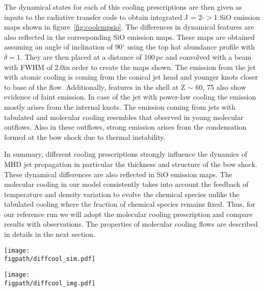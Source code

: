 \documentclass[useAMS,usenatbib]{mn2e}
\newcommand{\figpath}{/Users/bhargavvaidya/MyProject/work/Leeds_Uni/SiOJets_New/PAPER/PFIGS/}
\begin{document}
The dynamical states for each of this cooling prescriptions are then 
given as inputs to the radiative transfer code to obtain integrated J = 2-$>$1 SiO emission
maps shown in figure~\ref{fig:coolcmpsio}. The differences in dynamical
features are also reflected in the corresponding SiO emission
maps. These maps are obtained assuming an angle of inclination of
90$^\circ$ using the top hat abundance
profile with $\delta = 1$. They are then placed at a distance of
100$\,$pc and convolved with a beam with FWHM of 2.0\arcsec in order
to create the maps shown. 
The emission from the jet with atomic
cooling is coming from the conical jet head and younger knots closer
to base of the flow. Additionally, features in the shell at Z $\sim$
60, 75 also show evidence of faint emission. In case of the jet with
power-law cooling the emission mostly arises from the
internal knots. 
The emission coming from jets with
tabulated and molecular cooling resembles that observed in young molecular outflows.
Also in these outflows, strong emission arises from the
condensation formed at the bow shock due to thermal
instability. 
%

In summary, different cooling prescriptions strongly influence the
dynamics of MHD jet propagation in particular the thickness and
structure of the bow shock. These dynamical differences are
also reflected in SiO emission maps. The molecular cooling in our
model consistently takes into account the feedback of temperature and
density variation to evolve the chemical species unlike the tabulated cooling
where the fraction of chemical species remains fixed. Thus, for our reference
run we will adopt the molecular cooling prescription and compare
results with observations. The properties of
molecular cooling flows are described in details in the next section.

\begin{figure*}
 \texttt{[image: \\figpath/diffcool\_sim.pdf]}%
 \caption{Jet Volume Density for different cooling modes with
   $\eta$ = 10.}
\label{fig:coolcmpdyn}
\end{figure*}

\begin{figure*}
 \texttt{[image: \\figpath/diffcool\_img.pdf]}
 \caption{A plot of the integrated SiO J=2-$>$1 emission from 5 models, 
each using a different method to calculate cooling and all with $\eta$=10.}
\label{fig:coolcmpsio} 
\end{figure*}
\end{document}
